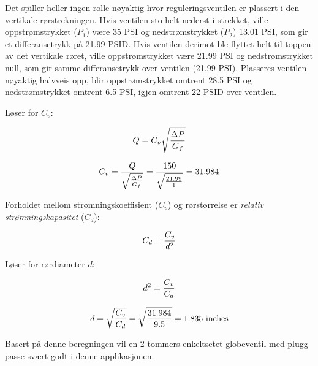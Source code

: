 Det spiller heller ingen rolle nøyaktig hvor reguleringsventilen er plassert i den vertikale rørstrekningen. Hvis ventilen sto helt nederst i strekket, ville oppstrømstrykket ($P_1$) være 35 PSI og nedstrømstrykket ($P_2$) 13.01 PSI, som gir et differansetrykk på 21.99 PSID. Hvis ventilen derimot ble flyttet helt til toppen av det vertikale røret, ville oppstrømstrykket være 21.99 PSI og nedstrømstrykket null, som gir samme differansetrykk over ventilen (21.99 PSI). Plasseres ventilen nøyaktig halvveis opp, blir oppstrømstrykket omtrent 28.5 PSI og nedstrømstrykket omtrent 6.5 PSI, igjen omtrent 22 PSID over ventilen.

\vskip 10pt

Løser for $C_v$:

$$Q = C_v \sqrt{\Delta P \over G_f}$$

$$C_v = {Q \over \sqrt{\Delta P \over G_f}} = {150 \over \sqrt{21.99 \over 1}} = 31.984$$

Forholdet mellom strømningskoeffisient ($C_v$) og rørstørrelse er {\it relativ strømningskapasitet} ($C_d$):

$$C_d = {C_v \over d^2}$$

Løser for rørdiameter $d$:

$$d^2 = {C_v \over C_d}$$

$$d = \sqrt{C_v \over C_d} = \sqrt{31.984 \over 9.5} = 1.835 \hbox{ inches}$$

Basert på denne beregningen vil en 2-tommers enkeltsetet globeventil med plugg passe svært godt i denne applikasjonen.



